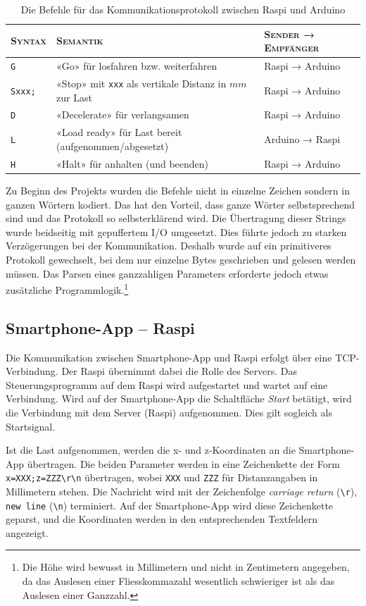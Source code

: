 \begin{table}
    \small
    \begin{tabularx}{\textwidth}{l|X|l}
        \textsc{Syntax} & \textsc{Semantik} & \textsc{Sender → Empfänger} \\
        \hline
        \texttt{G} & «Go» für losfahren bzw. weiterfahren & Raspi → Arduino \\
        \texttt{Sxxx;} & «Stop» mit \texttt{xxx} als vertikale Distanz in $mm$ zur Last & Raspi → Arduino \\
        \texttt{D} & «Decelerate» für verlangsamen & Raspi → Arduino \\
        \texttt{L} & «Load ready» für Last bereit (aufgenommen/abgesetzt) & Arduino → Raspi \\
        \texttt{H} & «Halt» für anhalten (und beenden) & Raspi → Arduino
    \end{tabularx}
    \caption{Die Befehle für das Kommunikationsprotokoll zwischen Raspi und Arduino}
    \label{tbl:raspi-arduino}
\end{table}

Zu Beginn des Projekts wurden die Befehle nicht in einzelne Zeichen sondern in ganzen Wörtern kodiert. Das hat den Vorteil, dass ganze Wörter selbstsprechend sind und das Protokoll so selbsterklärend wird. Die Übertragung dieser Strings wurde beidseitig mit gepuffertem I/O umgesetzt. Dies führte jedoch zu starken Verzögerungen bei der Kommunikation. Deshalb wurde auf ein primitiveres Protokoll gewechselt, bei dem nur einzelne Bytes geschrieben und gelesen werden müssen. Das Parsen eines ganzzahligen Parameters erforderte jedoch etwas zusätzliche Programmlogik.\footnote{Die Höhe wird bewusst in Millimetern und nicht in Zentimetern angegeben, da das Auslesen einer Fliesskommazahl wesentlich schwieriger ist als das Auslesen einer Ganzzahl.}

\subsection{Smartphone-App -- Raspi}

Die Kommunikation zwischen Smartphone-App und Raspi erfolgt über eine TCP-Verbindung. Der Raspi übernimmt dabei die Rolle des Servers. Das Steuerungsprogramm auf dem Raspi wird aufgestartet und wartet auf eine Verbindung. Wird auf der Smartphone-App die Schaltfläche \textit{Start} betätigt, wird die Verbindung mit dem Server (Raspi) aufgenommen. Dies gilt sogleich als Startsignal.

Ist die Last aufgenommen, werden die x- und z-Koordinaten an die Smartphone-App übertragen. Die beiden Parameter werden in eine Zeichenkette der Form \texttt{x=XXX;z=ZZZ\textbackslash{r}\textbackslash{n}} übertragen, wobei \texttt{XXX} und \texttt{ZZZ} für Distanzangaben in Millimetern stehen. Die Nachricht wird mit der Zeichenfolge \textit{carriage return} (\texttt{\textbackslash{r}}), \texttt{new line} (\texttt{\textbackslash{n}}) terminiert. Auf der Smartphone-App wird diese Zeichenkette geparst, und die Koordinaten werden in den entsprechenden Textfeldern angezeigt.

